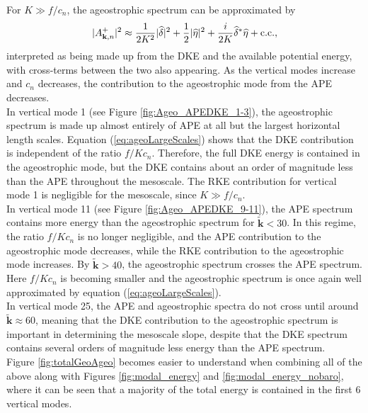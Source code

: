  For $K \gg f/c_n$,  the ageostrophic spectrum can be approximated by
\begin{align}
|A^+_{\mathbf{k},n}|^2 \approx \frac{1}{2K^2} |\widehat{\delta}|^2 + \frac{1}{2} |\widehat{\eta}|^2 + \frac{i}{2K} \widehat{\delta}^* \widehat{\eta} + \hbox{c.c.}, \label{eq:ageoLargeScales}
\end{align}
 interpreted as being made up from the DKE and the available potential energy, with cross-terms between the two also appearing. As the vertical modes increase and $c_n$ decreases, the contribution to the ageostrophic mode from the APE decreases.\\

 In vertical mode 1 (see Figure \ref{fig:Ageo_APEDKE_1-3}), the ageostrophic spectrum is made up almost entirely of APE at all but the largest horizontal length scales. Equation (\ref{eq:ageoLargeScales}) shows that the DKE contribution is independent of the ratio $f/Kc_n$. Therefore, the full DKE energy is contained in the ageostrophic mode, but the DKE contains about an order of magnitude less than the APE throughout the mesoscale. The RKE contribution for vertical mode 1 is negligible for the mesoscale, since $K \gg f/c_n$. \\
 
In vertical mode 11 (see Figure \ref{fig:Ageo_APEDKE_9-11}), the APE spectrum contains more energy than the ageostrophic spectrum for $\mathbf{\tilde{k}} < 30$. In this regime, the ratio $f/Kc_n$ is no longer negligible, and the APE contribution to the ageostrophic mode decreases, while the RKE contribution to the ageostrophic mode increases. By $\mathbf{\tilde{k}} > 40$, the ageostrophic spectrum crosses the APE spectrum. Here $f/Kc_n$ is becoming smaller and the ageostrophic spectrum is once again well approximated by equation (\ref{eq:ageoLargeScales}).\\
 
 In vertical mode 25, the APE and ageostrophic spectra do not cross until around $\mathbf{\tilde{k}} \approx 60$, meaning that the DKE contribution to the ageostrophic spectrum is important in determining the mesoscale slope, despite that the DKE spectrum contains several orders of magnitude less energy than the APE spectrum.\\
 
Figure \ref{fig:totalGeoAgeo} becomes easier to understand when combining all of the above along with Figures  \ref{fig:modal_energy} and \ref{fig:modal_energy_nobaro}, where it can be seen that a majority of the total energy is contained in the first 6 vertical modes. \\

